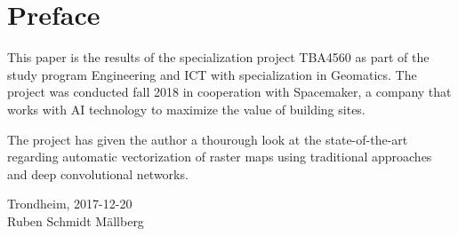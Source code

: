 \section*{Preface}
This paper is the results of the specialization project TBA4560 as part of the study program Engineering and ICT with specialization in Geomatics. The project was conducted fall 2018 in cooperation with Spacemaker, a company that works with AI technology to maximize the value of building sites. 

The project has given the author a thourough look at the state-of-the-art regarding automatic vectorization of raster maps using traditional approaches and deep convolutional networks.

\begin{center}
Trondheim, 2017-12-20\\[1pc]
Ruben Schmidt Mällberg
\end{center}